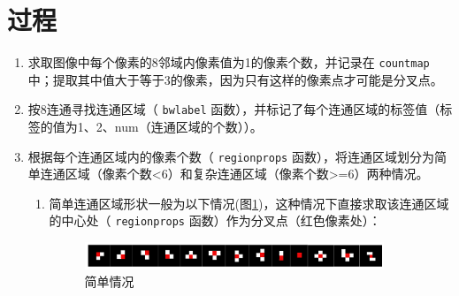 \documentclass[12pt]{article}
\begin{document}
\section{过程}
\begin{enumerate}
\item 求取图像中每个像素的8邻域内像素值为1的像素个数，并记录在 \verb|countmap| 中；提取其中值大于等于3的像素，因为只有这样的像素点才可能是分叉点。
\item 按8连通寻找连通区域（ \verb|bwlabel| 函数），并标记了每个连通区域的标签值（标签的值为1、2、num（连通区域的个数））。
\item 根据每个连通区域内的像素个数（ \verb|regionprops| 函数），将连通区域划分为简单连通区域（像素个数<6）和复杂连通区域（像素个数>=6）两种情况。
\begin{enumerate}
\item 简单连通区域形状一般为以下情况(图\ref{fig:simple})，这种情况下直接求取该连通区域的中心处（ \verb|regionprops| 函数）作为分叉点（红色像素处）：
\begin{figure}[ht]
\centering
\includegraphics[width=0.9\textwidth]{images/simple}
\caption{简单情况}
\label{fig:simple}
\end{figure}


\end{enumerate}
\end{enumerate}
\end{document}

